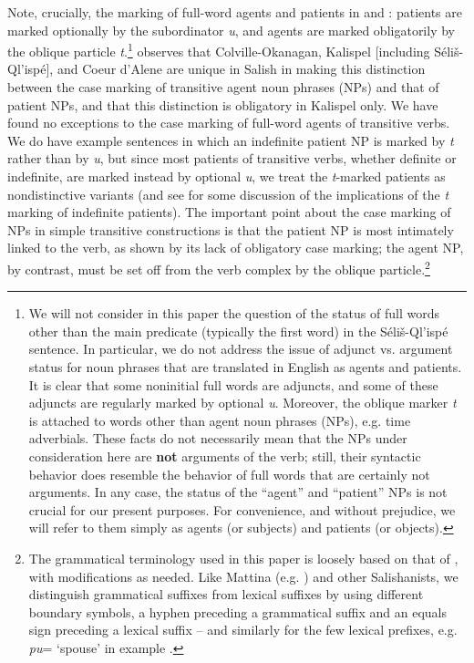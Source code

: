 \documentclass[output=paper,colorlinks,citecolor=brown]{langscibook}
\begin{document}
  Note, crucially, the marking of full-word agents and patients in 
  and : patients are marked optionally by the subordinator
  \emph{{\textltilde}u}, and agents are marked obligatorily by the
  oblique particle \emph{t}.\footnote{We will not consider in this
  paper the question of the status of full words other than the main
  predicate (typically the first word) in the S\'eli\v{s}-Ql'isp\'e
  sentence.  In particular, we do not address the issue of adjunct
  vs. argument status for noun phrases that are translated in English
  as agents and patients.  It is clear that some noninitial full
  words are adjuncts, and some of these adjuncts are regularly marked
  by optional \emph{{\textltilde}u}.  Moreover, the oblique marker
  \emph{t} is attached to words other than agent noun phrases (NPs),
  e.g.  time adverbials.  These facts do not necessarily mean that
  the NPs under consideration here are \textbf{not} arguments of the
  verb; still, their syntactic behavior does resemble the behavior of
  full words that are certainly not arguments.  In any case, the
  status of the ``agent'' and ``patient'' NPs is not crucial for our
  present purposes.  For convenience, and without prejudice, we will
  refer to them simply as agents (or subjects) and patients (or
  objects).  } \citet[52--53]{Kroeber:1999} observes that Colville-Okanagan,
  Kalispel [including S\'eli\v{s}-Ql'isp\'e], and Coeur d'Alene are
  unique in Salish in making this distinction between the case
  marking of transitive agent noun phrases (NPs) and that of patient
  NPs, and that this distinction is obligatory in Kalispel only.  We
  have found no exceptions to the case marking of full-word agents of
  transitive verbs.  We do have example sentences in which an
  indefinite patient NP is marked by \emph{t} rather than by \emph{{\textltilde}u}, but since most patients of transitive verbs,
  whether definite or indefinite, are marked instead by optional \emph{{\textltilde}u}, we treat the \emph{t}-marked patients as
  nondistinctive variants (and see  for some discussion of the
  implications of the \emph{t} marking of indefinite patients).  The
  important point about the case marking of NPs in simple transitive
  constructions is that the patient NP is most intimately linked to
  the verb, as shown by its lack of obligatory case marking; the
  agent NP, by contrast, must be set off from the verb complex by the
  oblique particle.\footnote{The grammatical terminology used in
  this paper is loosely based on that of \citet{Carlson:1972}, with
  modifications as needed.  Like Mattina (e.g. \citealt{Mattina:1987}) and other
  Salishanists, we distinguish grammatical suffixes from lexical
  suffixes by using different boundary symbols, a hyphen preceding a
  grammatical suffix and an equals sign preceding a lexical
  suffix -- and similarly for the few lexical prefixes, e.g. \emph{pu\textglotstop}= `spouse' in example .}
\end{document}
